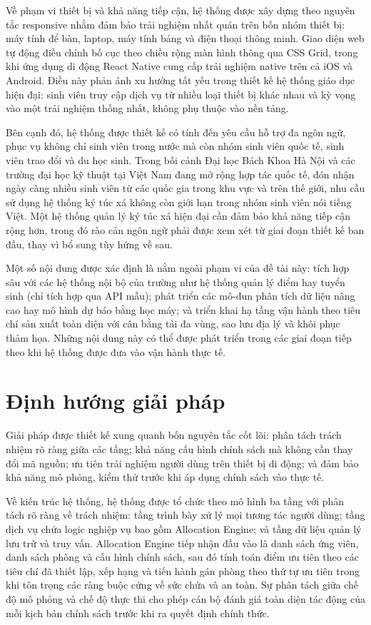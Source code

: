 \documentclass[../DoAn.tex]{subfiles}
\begin{document}
Về phạm vi thiết bị và khả năng tiếp cận, hệ thống được xây dựng theo nguyên
tắc responsive nhằm đảm bảo trải nghiệm nhất quán trên bốn nhóm thiết bị: máy
tính để bàn, laptop, máy tính bảng và điện thoại thông minh. Giao diện web tự
động điều chỉnh bố cục theo chiều rộng màn hình thông qua CSS Grid, trong khi
ứng dụng di động React Native cung cấp trải nghiệm native trên cả iOS và Android.
Điều này phản ánh xu hướng tất yếu trong thiết kế hệ thống giáo dục hiện đại:
sinh viên truy cập dịch vụ từ nhiều loại thiết bị khác nhau và kỳ vọng vào một
trải nghiệm thống nhất, không phụ thuộc vào nền tảng.

Bên cạnh đó, hệ thống được thiết kế có tính đến yêu cầu hỗ trợ đa ngôn ngữ,
phục vụ không chỉ sinh viên trong nước mà còn nhóm sinh viên quốc tế, sinh viên
trao đổi và du học sinh. Trong bối cảnh Đại học Bách Khoa Hà Nội và các trường
đại học kỹ thuật tại Việt Nam đang mở rộng hợp tác quốc tế, đón nhận ngày càng
nhiều sinh viên từ các quốc gia trong khu vực và trên thế giới, nhu cầu sử dụng
hệ thống ký túc xá không còn giới hạn trong nhóm sinh viên nói tiếng Việt. Một
hệ thống quản lý ký túc xá hiện đại cần đảm bảo khả năng tiếp cận rộng hơn,
trong đó rào cản ngôn ngữ phải được xem xét từ giai đoạn thiết kế ban đầu, thay
vì bổ sung tùy hứng về sau.

Một số nội dung được xác định là nằm ngoài phạm vi của đề tài này: tích hợp
sâu với các hệ thống nội bộ của trường như hệ thống quản lý điểm hay tuyển sinh
(chỉ tích hợp qua API mẫu); phát triển các mô-đun phân tích dữ liệu nâng cao
hay mô hình dự báo bằng học máy; và triển khai hạ tầng vận hành theo tiêu chí
sản xuất toàn diện với cân bằng tải đa vùng, sao lưu địa lý và khôi phục thảm
họa. Những nội dung này có thể được phát triển trong các giai đoạn tiếp theo khi
hệ thống được đưa vào vận hành thực tế.

\section{Định hướng giải pháp}
\label{section:1.3}

Giải pháp được thiết kế xung quanh bốn nguyên tắc cốt lõi: phân tách trách
nhiệm rõ ràng giữa các tầng; khả năng cấu hình chính sách mà không cần thay
đổi mã nguồn; ưu tiên trải nghiệm người dùng trên thiết bị di động; và đảm bảo
khả năng mô phỏng, kiểm thử trước khi áp dụng chính sách vào thực tế.

Về kiến trúc hệ thống, hệ thống được tổ chức theo mô hình ba tầng với phân tách
rõ ràng về trách nhiệm: tầng trình bày xử lý mọi tương tác người dùng; tầng
dịch vụ chứa logic nghiệp vụ bao gồm Allocation Engine; và tầng dữ liệu quản
lý lưu trữ và truy vấn. Allocation Engine tiếp nhận đầu vào là danh sách ứng
viên, danh sách phòng và cấu hình chính sách, sau đó tính toán điểm ưu tiên
theo các tiêu chí đã thiết lập, xếp hạng và tiến hành gán phòng theo thứ tự ưu
tiên trong khi tôn trọng các ràng buộc cứng về sức chứa và an toàn. Sự phân
tách giữa chế độ mô phỏng và chế độ thực thi cho phép cán bộ đánh giá toàn
diện tác động của mỗi kịch bản chính sách trước khi ra quyết định chính thức.
\end{document}
